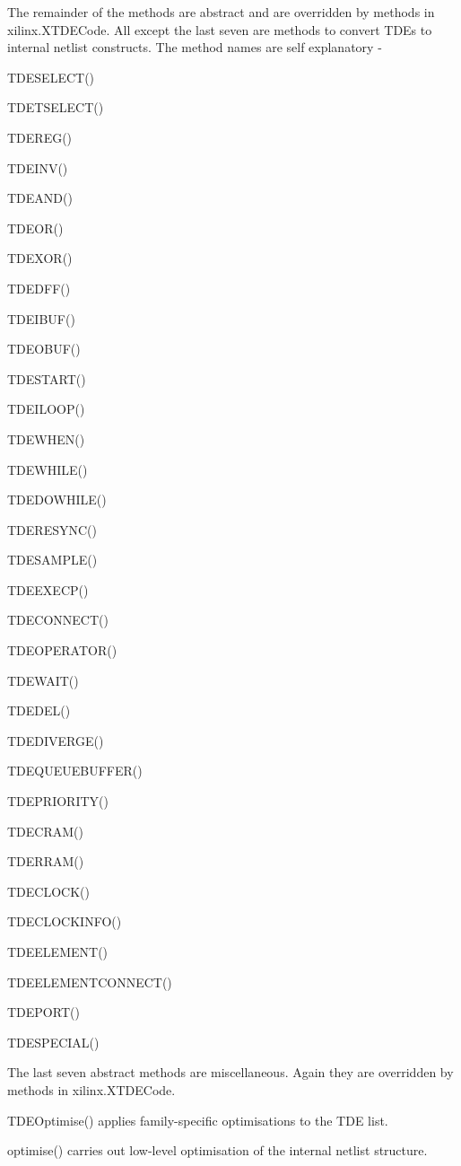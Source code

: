 The remainder of the methods are abstract and are overridden by
methods in xilinx.XTDECode. All except the last seven are methods
to convert TDEs to internal netlist constructs. The method names
are self explanatory -
\blist
\item   TDESELECT()
\item   TDETSELECT()
\item   TDEREG()
\item   TDEINV()
\item   TDEAND()
\item   TDEOR()
\item   TDEXOR()
\item   TDEDFF()
\item   TDEIBUF()
\item   TDEOBUF()
\item   TDESTART()
\item   TDEILOOP()
\item   TDEWHEN()
\item   TDEWHILE()
\item   TDEDOWHILE()
\item   TDERESYNC()
\item   TDESAMPLE()
\item   TDEEXECP()
\item   TDECONNECT()
\item   TDEOPERATOR()
\item   TDEWAIT()
\item   TDEDEL()
\item   TDEDIVERGE()
\item   TDEQUEUEBUFFER()
\item   TDEPRIORITY()
\item   TDECRAM()
\item   TDERRAM()
\item   TDECLOCK()
\item   TDECLOCKINFO()
\item   TDEELEMENT()
\item   TDEELEMENTCONNECT()
\item   TDEPORT()
\item   TDESPECIAL()
\blend

The last seven abstract methods are miscellaneous. Again they are
overridden by methods in xilinx.XTDECode.

TDEOptimise() applies family-specific optimisations to the TDE list.

optimise() carries out low-level optimisation of the internal netlist
structure.

